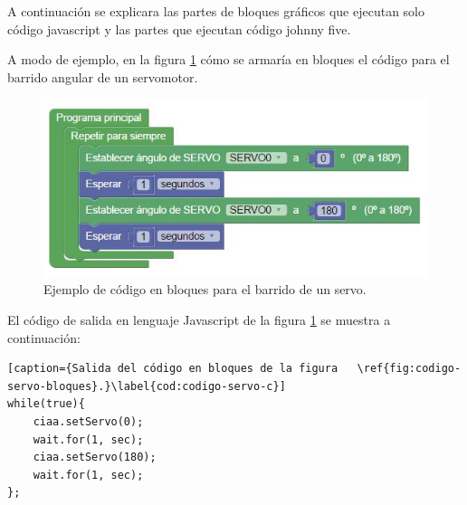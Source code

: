 A continuación se explicara las partes de bloques gráficos que ejecutan solo código javascript y las partes que ejecutan código johnny five.

A modo de ejemplo, en la figura \ref{fig:codigo-servo-bloques} cómo se armaría en bloques el código para el barrido angular de un servomotor.

\begin{figure}[!htbp]
	\centering
	\includegraphics[scale=.8]{./Figures/ejemplo-servo.jpg}
	\caption{Ejemplo de código en bloques para el barrido de un servo.}
	\label{fig:codigo-servo-bloques}
\end{figure}

El código de salida en lenguaje Javascript de la figura \ref{fig:codigo-servo-bloques} se muestra a continuación:


\begin{lstlisting}[caption={Salida del código en bloques de la figura 	\ref{fig:codigo-servo-bloques}.}\label{cod:codigo-servo-c}] 
while(true){
	ciaa.setServo(0);
	wait.for(1, sec);
	ciaa.setServo(180);
	wait.for(1, sec);
};

\end{lstlisting}


